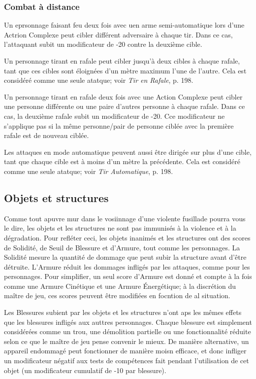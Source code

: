\subsubsection{Combat à distance} 

Un eprsonnage faisant feu deux fois avec uen arme semi-automatique lors d'une Actrion Complexe peut cibler différent adversaire à chaque tir. Dans ce cas, l'attaquant subit un modificateur de -20 contre la deuxième cible. 

Un personnage tirant en rafale peut cibler jusqu'à deux cibles à chaque rafale, tant que ces cibles sont éloignées d'un mètre maximum l'une de l'autre. Cela est considéré comme une seule atatque; voir \emph{Tir en Rafale}, p. 198. 

Un personnage tirant en rafale deux fois avec une Action Complexe peut cibler une personne différente ou une paire d'autres personne à chaque rafale. Dans ce cas, la deuxième rafale subit un modificateur de -20. Cce modificateur ne s'applique pas si la même personne/pair de personne ciblée avec la première rafale est de nouveau ciblée. 

Les attaques en mode automatique peuvent aussi être dirigée sur plus d'une cible, tant que chaque cible est à moins d'un mètre la précédente. Cela est considéré comme une seule atatque; voir \emph{Tir Automatique}, p. 198. 

\subsection{Objets et structures} \label{sec:objects-structures} 

Comme tout apuvre mur dans le vosiinnage d'une violente fusillade pourra vous le dire, les objets et les structures ne sont pas immunisés à la violence et à la dégradation. Pour refléter ceci, les objets inanimés et les structures ont des scores de Solidité, de Seuil de Blessure et d'Armure, tout comme les personnages. La Solidité mesure la quantité de dommage que peut subir la structure avant d'être détruite. L'Armure réduit les dommages infligés par les attaques, comme pour les personnages. Pour simplifier, un seul score d'Armure est donné et compte à la fois comme une Armure Cinétique et une Armure Énergétique; à la discrétion du maître de jeu, ces scores peuvent être modifiées en focntion de al situation. 

Les Blessures subient par les objets et les structures n'ont aps les mêmes effets que les blessures infligés aux auttres personnages. Chaque blessure est simplement considérées comme un trou, une démolition partielle ou une fonctionnalité réduite selon ce que le maître de jeu pense convenir le mieux. De manière alternative, un appareil endommagé peut fonctionner de manière moisn efficace, et donc infliger un modificateur négatif aux tests de compétences fait pendant l'utilisation de cet objet (un modificateur cumulatif de -10 par blessure). 

